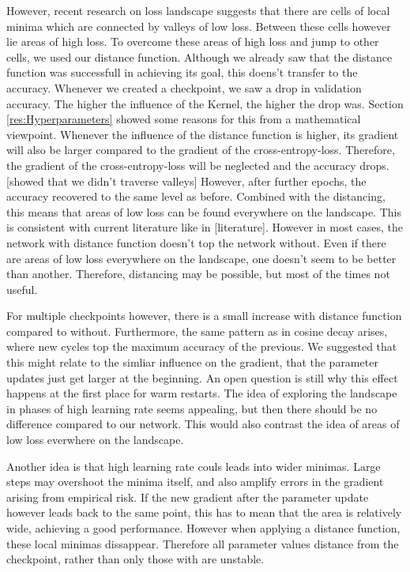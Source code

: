 However, recent research on loss landscape suggests that there are cells of
local minima which are connected by valleys of low loss. Between these cells
however lie areas of high loss. To overcome these areas of high loss and jump to
other cells, we used our distance function. Although we already saw that the
distance function was successfull in achieving its goal, this doens't transfer
to the accuracy. Whenever we created a checkpoint, we saw a drop in validation
accuracy. The higher the influence of the Kernel, the higher the drop was.
Section \ref{res:Hyperparameters} showed some reasons for this from a
mathematical viewpoint. Whenever the influence of the distance function is
higher, its gradient will also be larger compared to the gradient of the
cross-entropy-loss. Therefore, the gradient of the cross-entropy-loss will be
neglected and the accuracy drops. [showed that we didn't traverse valleys]
However, after further epochs, the accuracy recovered to the same level as
before. Combined with the distancing, this means that areas of low loss can be
found everywhere on the landscape. This is consistent with current literature
like in [literature]. However in most cases, the network with distance function
doesn't top the network without. Even if there are areas of low loss everywhere
on the landscape, one doesn't seem to be better than another. Therefore,
distancing may be possible, but most of the times not useful.


For multiple checkpoints however, there is a small increase with distance
function compared to without. Furthermore, the same pattern as in cosine decay
arises, where new cycles top the maximum accuracy of the previous. We suggested
that this might relate to the simliar influence on the gradient, that the
parameter updates just get larger at the beginning. An open question is still
why this effect happens at the first place for warm restarts. The idea of
exploring the landscape in phases of high learning rate seems appealing, but
then there should be no difference compared to our network. This would also
contrast the idea of areas of low loss everwhere on the landscape.

Another idea is that high learning rate couls leads into wider minimas. Large
steps may overshoot the minima itself, and also amplify errors in the gradient
arising from empirical risk. If the new gradient after the parameter update
however leads back to the same point, this has to mean that the area is
relatively wide, achieving a good performance. However when applying a distance
function, these local minimas dissappear. Therefore all parameter values
distance from the checkpoint, rather than only those with are unstable.


